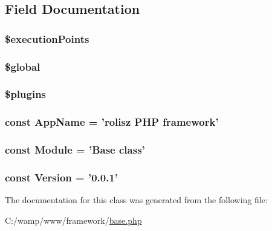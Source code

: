 \subsection{Field Documentation}
\hypertarget{classbase_a878a31351411a5b5d68c12c87c154084}{
\subsubsection[{\$executionPoints}]{\setlength{\rightskip}{0pt plus 5cm}\$executionPoints}}
\label{classbase_a878a31351411a5b5d68c12c87c154084}
\hypertarget{classbase_aad844777d9d6beb4ca7c92d97afe7d27}{
\subsubsection[{\$global}]{\setlength{\rightskip}{0pt plus 5cm}\$global}}
\label{classbase_aad844777d9d6beb4ca7c92d97afe7d27}
\hypertarget{classbase_a4ab51386acb82cd0a0066eac2567b2bd}{
\subsubsection[{\$plugins}]{\setlength{\rightskip}{0pt plus 5cm}\$plugins}}
\label{classbase_a4ab51386acb82cd0a0066eac2567b2bd}
\hypertarget{classbase_aab75444b144ffc4e972a9170e0a76ec0}{
\subsubsection[{AppName}]{\setlength{\rightskip}{0pt plus 5cm}const {\bf AppName} = '{\bf rolisz} PHP framework'}}
\label{classbase_aab75444b144ffc4e972a9170e0a76ec0}
\hypertarget{classbase_a2c348358c1db4bb5136855f7f31e1157}{
\subsubsection[{Module}]{\setlength{\rightskip}{0pt plus 5cm}const {\bf Module} = 'Base class'}}
\label{classbase_a2c348358c1db4bb5136855f7f31e1157}
\hypertarget{classbase_a62e44de9100d83ee01f5b4875b49a02b}{
\subsubsection[{Version}]{\setlength{\rightskip}{0pt plus 5cm}const {\bf Version} = '0.0.1'}}
\label{classbase_a62e44de9100d83ee01f5b4875b49a02b}


The documentation for this class was generated from the following file:\begin{DoxyCompactItemize}
\item 
C:/wamp/www/framework/\hyperlink{base_8php}{base.php}\end{DoxyCompactItemize}
